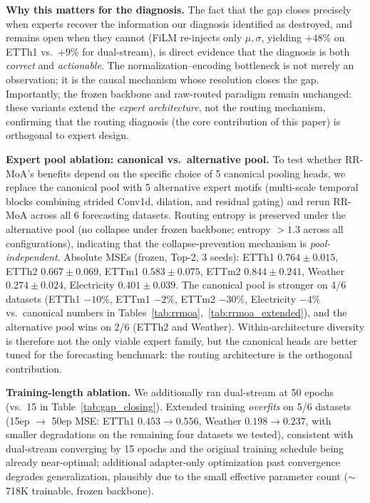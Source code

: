 \documentclass{article}
\begin{document}
\textbf{Why this matters for the diagnosis.} The fact that the gap closes precisely when experts recover the information our diagnosis identified as destroyed, and remains open when they cannot (FiLM re-injects only $\mu,\sigma$, yielding $+48\%$ on ETTh1 vs.\ $+9\%$ for dual-stream), is direct evidence that the diagnosis is both \emph{correct} and \emph{actionable}. The normalization--encoding bottleneck is not merely an observation; it is the causal mechanism whose resolution closes the gap. Importantly, the frozen backbone and raw-routed paradigm remain unchanged: these variants extend the \emph{expert architecture}, not the routing mechanism, confirming that the routing diagnosis (the core contribution of this paper) is orthogonal to expert design.

\textbf{Expert pool ablation: canonical vs.\ alternative pool.} To test whether RR-MoA's benefits depend on the specific choice of 5 canonical pooling heads, we replace the canonical pool with 5 alternative expert motifs (multi-scale temporal blocks combining strided Conv1d, dilation, and residual gating) and rerun RR-MoA across all 6 forecasting datasets. Routing entropy is preserved under the alternative pool (no collapse under frozen backbone; entropy $>1.3$ across all configurations), indicating that the collapse-prevention mechanism is \emph{pool-independent}. Absolute MSEs (frozen, Top-2, 3 seeds): ETTh1 $0.764{\pm}0.015$, ETTh2 $0.667{\pm}0.069$, ETTm1 $0.583{\pm}0.075$, ETTm2 $0.844{\pm}0.241$, Weather $0.274{\pm}0.024$, Electricity $0.401{\pm}0.039$. The canonical pool is stronger on 4/6 datasets (ETTh1 $-10\%$, ETTm1 $-2\%$, ETTm2 $-30\%$, Electricity $-4\%$ vs.\ canonical numbers in Tables~\ref{tab:rrmoa},~\ref{tab:rrmoa_extended}), and the alternative pool wins on 2/6 (ETTh2 and Weather). Within-architecture diversity is therefore not the only viable expert family, but the canonical heads are better tuned for the forecasting benchmark: the routing architecture is the orthogonal contribution.

\textbf{Training-length ablation.} We additionally ran dual-stream at 50 epochs (vs.\ 15 in Table~\ref{tab:gap_closing}). Extended training \emph{overfits} on 5/6 datasets (15ep $\to$ 50ep MSE: ETTh1 $0.453{\to}0.556$, Weather $0.198{\to}0.237$, with smaller degradations on the remaining four datasets we tested), consistent with dual-stream converging by 15 epochs and the original training schedule being already near-optimal; additional adapter-only optimization past convergence degrades generalization, plausibly due to the small effective parameter count ($\sim$718K trainable, frozen backbone).
\end{document}
